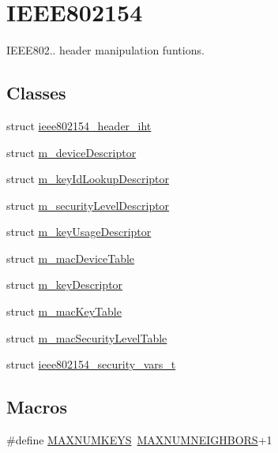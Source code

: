 \hypertarget{group___i_e_e_e802154}{}\section{I\+E\+E\+E802154}
\label{group___i_e_e_e802154}


I\+E\+E\+E802.. header manipulation funtions.  


\subsection*{Classes}
\begin{DoxyCompactItemize}
\item 
struct \hyperlink{structieee802154__header__iht}{ieee802154\+\_\+header\+\_\+iht}
\item 
struct \hyperlink{structm__device_descriptor}{m\+\_\+device\+Descriptor}
\item 
struct \hyperlink{structm__key_id_lookup_descriptor}{m\+\_\+key\+Id\+Lookup\+Descriptor}
\item 
struct \hyperlink{structm__security_level_descriptor}{m\+\_\+security\+Level\+Descriptor}
\item 
struct \hyperlink{structm__key_usage_descriptor}{m\+\_\+key\+Usage\+Descriptor}
\item 
struct \hyperlink{structm__mac_device_table}{m\+\_\+mac\+Device\+Table}
\item 
struct \hyperlink{structm__key_descriptor}{m\+\_\+key\+Descriptor}
\item 
struct \hyperlink{structm__mac_key_table}{m\+\_\+mac\+Key\+Table}
\item 
struct \hyperlink{structm__mac_security_level_table}{m\+\_\+mac\+Security\+Level\+Table}
\item 
struct \hyperlink{structieee802154__security__vars__t}{ieee802154\+\_\+security\+\_\+vars\+\_\+t}
\end{DoxyCompactItemize}
\subsection*{Macros}
\begin{DoxyCompactItemize}
\item 
\#define \hyperlink{group___i_e_e_e802154_ga344024978aad7388feba040dc0d9e864}{M\+A\+X\+N\+U\+M\+K\+E\+YS}~\hyperlink{group___neighbors_gaf83606573bb704d34705b540c226a0d9}{M\+A\+X\+N\+U\+M\+N\+E\+I\+G\+H\+B\+O\+RS}+1
\end{DoxyCompactItemize}
